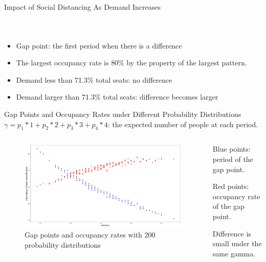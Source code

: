 \begin{frame}{Impact of Social Distancing As Demand Increases}
\begin{columns}
\begin{figure}[ht]
          \end{figure}
      \end{columns}
      \begin{itemize}
        \item Gap point: the first period when there is a difference 
        \item The largest occupancy rate is {\color{red}80\%} by the property of the largest pattern.
        \item Demand {\color{green}less than} 71.3\% total seats: no difference
        \item Demand {\color{violet}larger than} 71.3\% total seats: difference becomes larger
      \end{itemize}
  \end{frame}

    \begin{frame}{Gap Points and Occupancy Rates under Different Probability Distributions}
      \scriptsize
      $\gamma = p_1 * 1 + p_2 * 2 + p_3 * 3 + p_4 * 4$: the expected number of people at each period.

      \begin{columns}
      \begin{column}{0.7\textwidth}
      
      \begin{figure}[ht]
        \centering
        \includegraphics[width = 1\textwidth]{./images/gamma1.pdf}
        \caption{Gap points and occupancy rates with 200 probability distributions}
    \end{figure}
  \end{column}
    \begin{column}{0.3\textwidth}
    \scriptsize
    {\color{blue} Blue points}: period of the gap point.
      \vspace{0.2cm}

    {\color{red} Red points}: occupancy rate of the gap point. 
    \vspace{0.2cm}

    Difference is small under the same gamma.
  \end{column}
  \end{columns}
    \end{frame}

